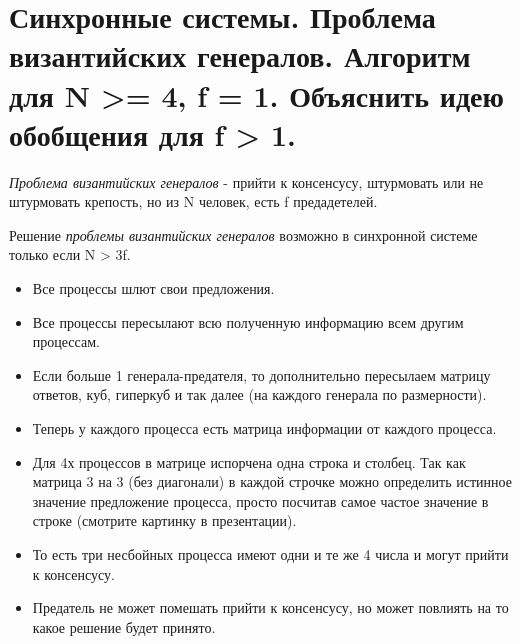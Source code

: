 \section{Синхронные системы. Проблема византийских генералов. Алгоритм для N >= 4, f = 1. Объяснить идею обобщения для f > 1.}

\begin{definition}
    \textit{Проблема византийских генералов} - прийти к консенсусу, штурмовать или не штурмовать крепость, но из N человек, есть f предадетелей.
\end{definition}

\begin{theorem}
    Решение \textit{проблемы византийских генералов} возможно в синхронной системе только если N > 3f.
\end{theorem}

\begin{algorithm}
    \enewline
    \begin{itemize}
        \item Все процессы шлют свои предложения.
        \item Все процессы пересылают всю полученную информацию всем другим процессам.
        \item Если больше 1 генерала-предателя, то дополнительно пересылаем матрицу ответов, куб,
            гиперкуб и так далее (на каждого генерала по размерности).
        \item Теперь у каждого процесса есть матрица информации от каждого процесса.
        \item Для 4х процессов в матрице испорчена одна строка и столбец.
            Так как матрица 3 на 3 (без диагонали) в каждой строчке можно определить истинное
            значение предложение процесса, просто посчитав самое частое значение в строке
            (смотрите картинку в презентации).
        \item То есть три несбойных процесса имеют одни и те же 4 числа и могут прийти к консенсусу.
        \item Предатель не может помешать прийти к консенсусу, но может повлиять на то какое решение будет принято.
    \end{itemize}
\end{algorithm}
